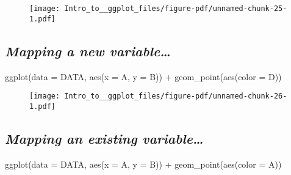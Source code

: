 \documentclass[
  letterpaper,
  DIV=11,
  numbers=noendperiod]{scrartcl}
\newenvironment{Shaded}{\begin{snugshade}}{\end{snugshade}}
\newcommand{\AttributeTok}[1]{\textcolor[rgb]{0.40,0.45,0.13}{#1}}
\newcommand{\FunctionTok}[1]{\textcolor[rgb]{0.28,0.35,0.67}{#1}}
\newcommand{\NormalTok}[1]{\textcolor[rgb]{0.00,0.23,0.31}{#1}}
\newcommand{\SpecialCharTok}[1]{\textcolor[rgb]{0.37,0.37,0.37}{#1}}
\begin{document}
\begin{figure}[H]

{\centering \texttt{[image: Intro\_to\_\_ggplot\_files/figure-pdf/unnamed-chunk-25-1.pdf]}

}

\end{figure}

\hypertarget{mapping-a-new-variable}{%
\subsection{\texorpdfstring{\emph{Mapping a new
variable\ldots{}}}{Mapping a new variable\ldots{}}}\label{mapping-a-new-variable}}

\begin{Shaded}
\begin{Highlighting}[]
\FunctionTok{ggplot}\NormalTok{(}\AttributeTok{data =}\NormalTok{ DATA, }\FunctionTok{aes}\NormalTok{(}\AttributeTok{x =}\NormalTok{ A, }\AttributeTok{y =}\NormalTok{ B)) }\SpecialCharTok{+} 
  \FunctionTok{geom\_point}\NormalTok{(}\FunctionTok{aes}\NormalTok{(}\AttributeTok{color =}\NormalTok{ D))}
\end{Highlighting}
\end{Shaded}

\begin{figure}[H]

{\centering \texttt{[image: Intro\_to\_\_ggplot\_files/figure-pdf/unnamed-chunk-26-1.pdf]}

}

\end{figure}

\hypertarget{mapping-an-existing-variable}{%
\subsection{\texorpdfstring{\emph{Mapping an existing
variable\ldots{}}}{Mapping an existing variable\ldots{}}}\label{mapping-an-existing-variable}}

\begin{Shaded}
\begin{Highlighting}[]
\FunctionTok{ggplot}\NormalTok{(}\AttributeTok{data =}\NormalTok{ DATA, }\FunctionTok{aes}\NormalTok{(}\AttributeTok{x =}\NormalTok{ A, }\AttributeTok{y =}\NormalTok{ B)) }\SpecialCharTok{+} 
  \FunctionTok{geom\_point}\NormalTok{(}\FunctionTok{aes}\NormalTok{(}\AttributeTok{color =}\NormalTok{ A))}
\end{Highlighting}
\end{Shaded}
\end{document}
